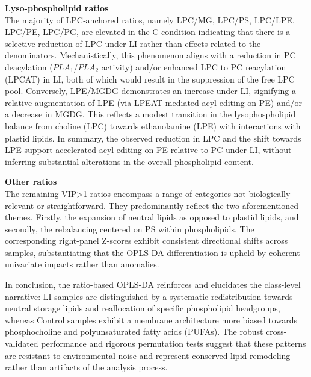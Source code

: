 \documentclass[10pt,letterpaper]{article}
\begin{document}
\textbf{Lyso-phospholipid ratios}  \\
The majority of LPC‐anchored ratios, namely LPC/MG, LPC/PS, LPC/LPE, LPC/PE, LPC/PG, are elevated in the C condition indicating that there is a selective reduction of LPC under LI rather than effects related to the denominators. Mechanistically, this phenomenon aligns with a reduction in PC deacylation ($PLA_1$/$PLA_2$ activity) and/or enhanced LPC to PC reacylation (LPCAT) in LI, both of which would result in the suppression of the free LPC pool. Conversely, LPE/MGDG demonstrates an increase under LI, signifying a relative augmentation of LPE (via LPEAT-mediated acyl editing on PE) and/or a decrease in MGDG. This reflects a modest transition in the lysophospholipid balance from choline (LPC) towards ethanolamine (LPE) with interactions with plastid lipids. In summary, the observed reduction in LPC and the shift towards LPE support accelerated acyl editing on PE relative to PC under LI, without inferring substantial alterations in the overall phospholipid content.

\textbf{Other ratios}  \\
The remaining VIP\textgreater1 ratios encompass a range of categories not biologically relevant or straightforward. They predominantly reflect the two aforementioned themes. Firstly, the expansion of neutral lipids as opposed to plastid lipids, and secondly, the rebalancing centered on PS within phospholipids. The corresponding right-panel Z-scores exhibit consistent directional shifts across samples, substantiating that the OPLS-DA differentiation is upheld by coherent univariate impacts rather than anomalies.

In conclusion, the ratio-based OPLS-DA reinforces and elucidates the class-level narrative: LI samples are distinguished by a systematic redistribution towards neutral storage lipids and reallocation of specific phospholipid headgroups, whereas Control samples exhibit a membrane architecture more biased towards phosphocholine and polyunsaturated fatty acids (PUFAs). The robust cross-validated performance and rigorous permutation tests suggest that these patterns are resistant to environmental noise and represent conserved lipid remodeling rather than artifacts of the analysis process.
\end{document}
